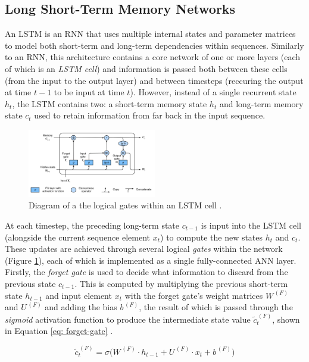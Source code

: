 \documentclass[a4paper, 11pt]{report}
\begin{document}
    \subsection{Long Short-Term Memory Networks}

    An LSTM is an RNN that uses multiple internal states and parameter matrices to model both short-term and long-term dependencies within sequences. Similarly to an RNN, this architecture contains a core network of one or more layers (each of which is an \emph{LSTM cell}) and information is passed both between these cells (from the input to the output layer) and between timesteps (reccuring the output at time $t-1$ to be input at time $t$). However, instead of a single recurrent state $h_t$, the LSTM contains two: a short-term memory state $h_t$ and long-term memory state $c_t$ used to retain information from far back in the input sequence.

    \begin{figure}[ht]
        \centering
        \includegraphics[width=0.5\textwidth]{lstm.png}
        \caption{\centering Diagram of a the logical gates within an LSTM cell \citep{zhang-2021}.}
        \label{fig: lstm}
    \end{figure}

    At each timestep, the preceding long-term state $c_{t-1}$ is input into the LSTM cell (alongside the current sequence element $x_t$) to compute the new states $h_t$ and $c_t$. These updates are achieved through several logical \emph{gates} within the network (Figure \ref{fig: lstm}), each of which is implemented as a single fully-connected ANN layer. Firstly, the \emph{forget gate} is used to decide what information to discard from the previous state $c_{t-1}$. This is computed by multiplying the previous short-term state $h_{t-1}$ and input element $x_t$ with the forget gate's weight matrices $W^{\,(F)}$ and $U^{\,(F)}$ and adding the bias $b^{\,(F)}$, the result of which is passed through the \emph{sigmoid} activation function to produce the intermediate state value $\tilde{c}^{\,(F)}_t$, shown in Equation \ref{eq: forget-gate} \citep{zhang-2021}.

    \begin{equation}
        \label{eq: forget-gate}
        \tilde{c}^{\,(F)}_t = \sigma \Big( W^{\,(F)} \cdot h_{t-1} + U^{\,(F)} \cdot x_t + b^{\,(F)} \Big)
    \end{equation}
\end{document}
